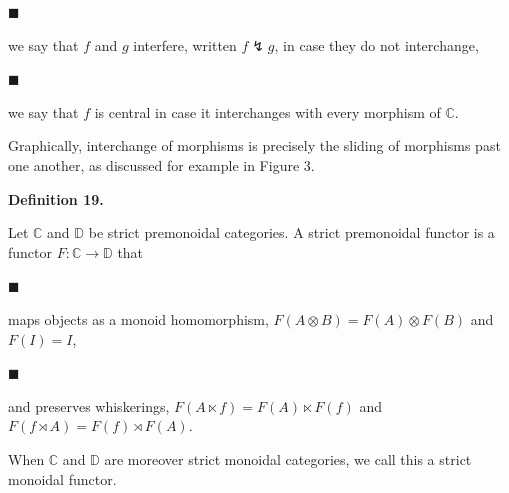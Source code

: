 
\par\noindent  $\blacksquare$ 
 
we say that $f$ and $g$ interfere, written $f\lightning g$, in case they do not interchange,\par
 
 
 
\par\noindent  $\blacksquare$ 
 
we say that $f$ is central in case it interchanges with every morphism of $\mathbb{C}$.\par
 
 
  
 
 
 
Graphically, interchange of morphisms is precisely the sliding of morphisms past one another, as discussed for example in Figure 3.\par
 
 
 
\par\medskip\noindent\textbf{Definition 19.}\par
 
 
Let $\mathbb{C}$ and $\mathbb{D}$ be strict premonoidal categories. A strict premonoidal functor is a functor $F:\mathbb{C}\to\mathbb{D}$ that\par
  
\par\noindent  $\blacksquare$ 
 
maps objects as a monoid homomorphism, $F(A\otimes B)=F(A)\otimes F(B)$ and $F(I)=I$,\par
 
 
 
\par\noindent  $\blacksquare$ 
 
and preserves whiskerings, $F(A\ltimes f)=F(A)\ltimes F(f)$ and $F(f\rtimes A)=F(f)\rtimes F(A)$.\par
 
 
  
When $\mathbb{C}$ and $\mathbb{D}$ are moreover strict monoidal categories, we call this a strict monoidal functor.\par
 
